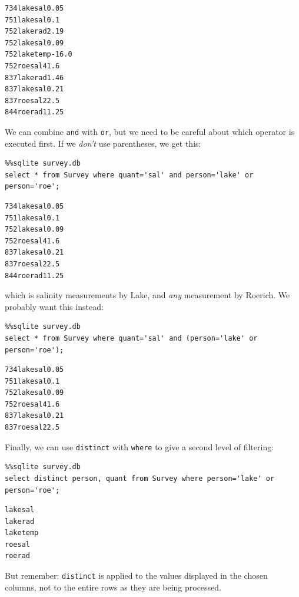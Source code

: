 \documentclass{book}
\begin{document}
\begin{verbatim}
734lakesal0.05
751lakesal0.1
752lakerad2.19
752lakesal0.09
752laketemp-16.0
752roesal41.6
837lakerad1.46
837lakesal0.21
837roesal22.5
844roerad11.25
\end{verbatim}

We can combine \texttt{and} with \texttt{or}, but we need to be careful
about which operator is executed first. If we \emph{don't} use
parentheses, we get this:

\begin{verbatim}
%%sqlite survey.db
select * from Survey where quant='sal' and person='lake' or person='roe';
\end{verbatim}

\begin{verbatim}
734lakesal0.05
751lakesal0.1
752lakesal0.09
752roesal41.6
837lakesal0.21
837roesal22.5
844roerad11.25
\end{verbatim}

which is salinity measurements by Lake, and \emph{any} measurement by
Roerich. We probably want this instead:

\begin{verbatim}
%%sqlite survey.db
select * from Survey where quant='sal' and (person='lake' or person='roe');
\end{verbatim}

\begin{verbatim}
734lakesal0.05
751lakesal0.1
752lakesal0.09
752roesal41.6
837lakesal0.21
837roesal22.5
\end{verbatim}

Finally, we can use \texttt{distinct} with \texttt{where} to give a
second level of filtering:

\begin{verbatim}
%%sqlite survey.db
select distinct person, quant from Survey where person='lake' or person='roe';
\end{verbatim}

\begin{verbatim}
lakesal
lakerad
laketemp
roesal
roerad
\end{verbatim}

But remember: \texttt{distinct} is applied to the values displayed in
the chosen columns, not to the entire rows as they are being processed.
\end{document}
